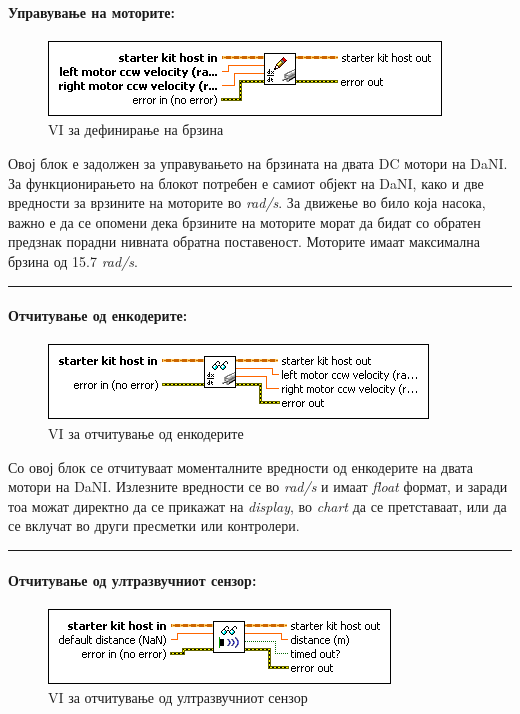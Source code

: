 \documentclass[12pt]{article}
\begin{document}
    \paragraph{Управување на моторите:\\}
      \begin{figure}[h]
        \includegraphics[width=0.55\linewidth]{./images/write_dc.png}
				\raggedright
				\caption{VI за дефинирање на брзина}
				\label{fig:write_dc.png}
				\end{figure}
			Овој блок е задолжен за управувањето на брзината на двата DC мотори на DaNI. За функционирањето на блокот потребен е самиот објект на DaNI, како и две вредности за врзините на моторите во \textit{rad/s}. За движење во било која насока, важно е да се опомени дека брзините на моторите морат да бидат со обратен предзнак порадни нивната обратна поставеност. Моторите имаат максимална брзина од 15.7 \textit{rad/s}.
      \textcolor[RGB]{150,150,150}{\rule{\linewidth}{1.6pt}}

    \paragraph{Отчитување од енкодерите:\\}
    	\begin{figure}[h]
        \includegraphics[width=0.55\linewidth]{./images/read_dc.png}
				\raggedright
				\caption{VI за отчитување од енкодерите}
				\label{fig:read_dc.png}
				\end{figure}

      Со овој блок се отчитуваат моменталните вредности од енкодерите на двата мотори на DaNI. Излезните вредности се во \textit{rad/s} и имаат \textit{float} формат, и заради тоа можат директно да се прикажат на \textit{display}, во \textit{chart} да се претставаат, или да се вклучат во други пресметки или контролери.
      \textcolor[RGB]{150,150,150}{\rule{\linewidth}{1.6pt}}

    \paragraph{Отчитување од ултразвучниот сензор:\\}
        \begin{figure}[H]
          \includegraphics[width=0.55\linewidth]{./images/read_ping.png}
				  \raggedright
				  \caption{VI за отчитување од ултразвучниот сензор}
				  \label{fig:read_ping.png}
				  \end{figure}
\end{document}

